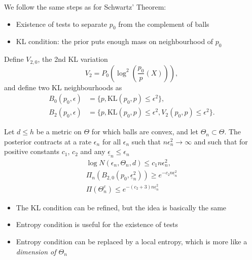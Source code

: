 We follow the same steps as for Schwartz' Theorem: 
\begin{itemize}
\item Existence of tests to separate $p_0$ from the complement of balls
\item KL condition: the prior puts enough mass on neighbourhood of $p_0$
\end{itemize}
Define $V_{2,0}$, the 2nd KL variation
$$
V_{2} = P_0 \left( \log^2\left(\frac{p_0}{p}(X) \right)\right),
$$ 
and define two KL neighbourhoods as
\begin{align*}
B_0(p_0,\epsilon) &= \{p, \text{KL}(p_0,p) \leq \epsilon^2\},\\
B_2(p_0,\epsilon) &= \{p, \text{KL}(p_0,p) \leq \epsilon^2, V_{2}(p_0,p) \leq \epsilon^2\}.
\end{align*}








\begin{theorem}
Let $d \leq h$ be a metric on $\Theta$ for which balls are convex, and let $\Theta_n \subset \Theta $. The posterior contracts at a rate $\epsilon_n$ for all $\epsilon_n$ such that $n\epsilon_n^2 \to \infty$ and such that for positive constants $c_1$, $c_2$ and any $\underline{\epsilon}_n \leq \epsilon_n$
\begin{align*}
\log N(\epsilon_n, \Theta_n, d) \leq c_1 n \epsilon_n^2, \\ 
\Pi_n(B_{2,0}(p_0,\underline{\epsilon}_n^2)) \geq e^{-c_2 n \underline{\epsilon}_n^2}\\
\Pi(\Theta_n^c) \leq e^{-(c_2+3)n \underline{\epsilon}_n^2}
\end{align*}
\end{theorem}








\begin{itemize}
\item The KL condition can be refined, but the idea is basically the same
\item Entropy condition is useful for the existence of tests
\item Entropy condition can be replaced by a local entropy, which is more like a \emph{dimension of $\Theta_n$}
\end{itemize}
 
